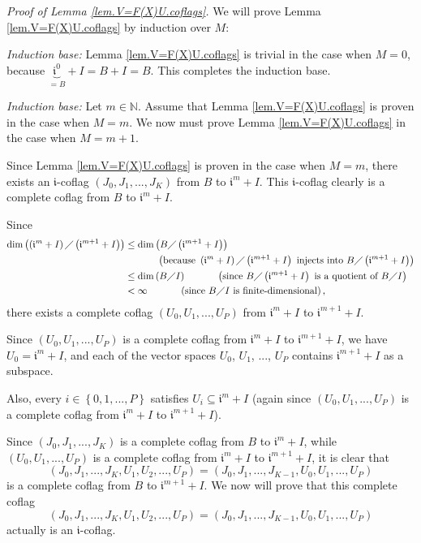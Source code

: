 \documentclass[etingof-lie.tex]{subfiles}
\begin{document}
\textit{Proof of Lemma \ref{lem.V=F(X)U.coflags}.} We will prove Lemma
\ref{lem.V=F(X)U.coflags} by induction over $M$:

\textit{Induction base:} Lemma \ref{lem.V=F(X)U.coflags} is trivial in the
case when $M=0$, because $\underbrace{\mathfrak{i}^{0}}_{=B}+I=B+I=B$. This
completes the induction base.

\textit{Induction base:} Let $m\in\mathbb{N}$. Assume that Lemma
\ref{lem.V=F(X)U.coflags} is proven in the case when $M=m$. We now must prove
Lemma \ref{lem.V=F(X)U.coflags} in the case when $M=m+1$.

Since Lemma \ref{lem.V=F(X)U.coflags} is proven in the case when $M=m$, there
exists an $\mathfrak{i}$-coflag $\left(  J_{0},J_{1},...,J_{K}\right)  $ from
$B$ to $\mathfrak{i}^{m}+I$. This $\mathfrak{i}$-coflag clearly is a complete
coflag from $B$ to $\mathfrak{i}^{m}+I$.

Since
\begin{align*}
\dim\left(  \left(  \mathfrak{i}^{m}+I\right)  \diagup\left(  \mathfrak{i}%
^{m+1}+I\right)  \right)   &  \leq\dim\left(  B\diagup\left(  \mathfrak{i}%
^{m+1}+I\right)  \right) \\
&  \ \ \ \ \ \ \ \ \ \ \left(  \text{because }\left(  \mathfrak{i}%
^{m}+I\right)  \diagup\left(  \mathfrak{i}^{m+1}+I\right)  \text{ injects into
}B\diagup\left(  \mathfrak{i}^{m+1}+I\right)  \right) \\
&  \leq\dim\left(  B\diagup I\right)  \ \ \ \ \ \ \ \ \ \ \left(  \text{since
}B\diagup\left(  \mathfrak{i}^{m+1}+I\right)  \text{ is a quotient of
}B\diagup I\right) \\
&  <\infty\ \ \ \ \ \ \ \ \ \ \left(  \text{since }B\diagup I\text{ is
finite-dimensional}\right)  ,
\end{align*}
there exists a complete coflag $\left(  U_{0},U_{1},...,U_{P}\right)  $ from
$\mathfrak{i}^{m}+I$ to $\mathfrak{i}^{m+1}+I$.

Since $\left(  U_{0},U_{1},...,U_{P}\right)  $ is a complete coflag from
$\mathfrak{i}^{m}+I$ to $\mathfrak{i}^{m+1}+I$, we have $U_{0}=\mathfrak{i}%
^{m}+I$, and each of the vector spaces $U_{0}$, $U_{1}$, $...$, $U_{P}$
contains $\mathfrak{i}^{m+1}+I$ as a subspace.

Also, every $i\in\left\{  0,1,...,P\right\}  $ satisfies $U_{i}\subseteq
\mathfrak{i}^{m}+I$ (again since $\left(  U_{0},U_{1},...,U_{P}\right)  $ is a
complete coflag from $\mathfrak{i}^{m}+I$ to $\mathfrak{i}^{m+1}+I$).

Since $\left(  J_{0},J_{1},...,J_{K}\right)  $ is a complete coflag from $B$
to $\mathfrak{i}^{m}+I$, while $\left(  U_{0},U_{1},...,U_{P}\right)  $ is a
complete coflag from $\mathfrak{i}^{m}+I$ to $\mathfrak{i}^{m+1}+I$, it is
clear that
\[
\left(  J_{0},J_{1},...,J_{K},U_{1},U_{2},...,U_{P}\right)  =\left(
J_{0},J_{1},...,J_{K-1},U_{0},U_{1},...,U_{P}\right)
\]
is a complete coflag from $B$ to $\mathfrak{i}^{m+1}+I$. We now will prove
that this complete coflag
\[
\left(  J_{0},J_{1},...,J_{K},U_{1},U_{2},...,U_{P}\right)  =\left(
J_{0},J_{1},...,J_{K-1},U_{0},U_{1},...,U_{P}\right)
\]
actually is an $\mathfrak{i}$-coflag.
\end{document}
